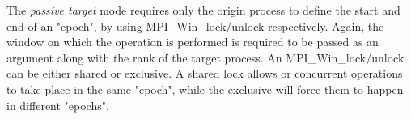 The \emph{passive target} mode requires only the origin process to define the start and end of an "epoch", by using 
MPI\_Win\_lock/unlock respectively.  Again, the window on which the operation is performed is required to be passed as
an argument along with the rank of the target process.  An MPI\_Win\_lock/unlock can be either shared or exclusive.
A shared lock allows or concurrent operations to take place in the same "epoch", while the exclusive will force them
to happen in different "epochs".

